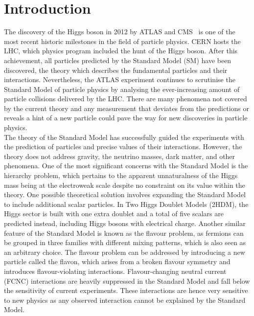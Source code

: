 \setchapterpreamble[u]{\margintoc}
\chapter*{Introduction}
The discovery of the Higgs boson in 2012 by ATLAS and CMS~\cite{ATLASHiggs2012,CMShiggs2012} is one of the most recent historic milestones in the field of particle physics. CERN hosts the LHC, which physics program included the hunt of the Higgs boson. After this achievement, all particles predicted by the Standard Model (SM) have been discovered, the theory which describes the fundamental particles and their interactions. Nevertheless, the ATLAS experiment continues to scrutinise the Standard Model of particle physics by analysing the ever-increasing amount of particle collisions delivered by the LHC. There are many phenomena not covered by the current theory and any measurement that deviates from the predictions or reveals a hint of a new particle could pave the way for new discoveries in particle physics.\\

The theory of the Standard Model has successfully guided the experiments with the prediction of particles and precise values of their interactions. However, the theory does not address gravity, the neutrino masses, dark matter, and other phenomena. One of the most significant concerns with the Standard Model is the hierarchy problem, which pertains to the apparent unnaturalness of the Higgs mass being at the electroweak scale despite no constraint on its value within the theory. One possible theoretical solution involves expanding the Standard Model to include additional scalar particles. In Two Higgs Doublet Models (2HDM), the Higgs sector is built with one extra doublet and a total of five scalars are predicted instead, including Higgs bosons with electrical charge.
Another similar feature of the Standard Model is known as the flavour problem, as fermions can be grouped in three families with different mixing patterns, which is also seen as an arbitrary choice. The flavour problem can be addressed by introducing a new particle called the flavon, which arises from a broken flavour symmetry and introduces flavour-violating interactions. Flavour-changing neutral current (FCNC) interactions are heavily suppressed in the Standard Model and fall below the sensitivity of current experiments. These interactions are hence very sensitive to new physics as any observed interaction cannot be explained by the Standard Model.\\

